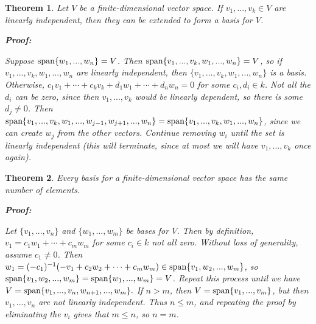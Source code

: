 \documentclass{article}
\theoremstyle{colontheorem}
\newtheorem{theorem}{Theorem}[section]
\newcommand{\Span}{\textnormal{span}}
\newenvironment{Theorem}
{
	\begin{mdframed}[backgroundcolor=TheoremOrange!10]
	\begin{theorem}
}
{
	\end{theorem}
	\end{mdframed}
	
	\vspace{.15in}
}
\newenvironment{Proof}
{
	\begin{mdframed}[backgroundcolor=ProofPurple!10]
	\textbf{Proof:}%
}
{
	\end{mdframed}
	
	\vspace{.085in}
}
\begin{document}
\begin{Theorem}
	
	Let $V$ be a finite-dimensional vector space. If $v_1, ..., v_k \in V$ are linearly independent, then they can be extended to form a basis for $V$.
	
	\begin{Proof}
		Suppose $\Span \{w_1, ..., w_n\} = V$. Then $\Span \{v_1, ..., v_k, w_1, ..., w_n\} = V$, so if \linebreak $v_1, ..., v_k, w_1, ..., w_n$ are linearly independent, then $\{v_1, ..., v_k, w_1, ..., w_n\}$ is a basis. Otherwise, $c_1 v_1 + \cdots + c_k v_k + d_1 w_1 + \cdots + d_n w_n = 0$ for some $c_i , d_i \in k$. Not all the $d_i$ can be zero, since then $v_1, ..., v_k$ would be linearly dependent, so there is some $d_j \neq 0$. Then $\Span \{v_1, ..., v_k, w_1, ..., w_{j-1}, w_{j+1}, ..., w_n\} = \Span \{v_1, ..., v_k, w_1, ..., w_n\}$, since we can create $w_j$ from the other vectors. Continue removing $w_i$ until the set is linearly independent (this will terminate, since at most we will have $v_1, ..., v_k$ once again).
		
	\end{Proof}
	
\end{Theorem}



\begin{Theorem}
	
	Every basis for a finite-dimensional vector space has the same number of elements.
	
	\begin{Proof}
		Let $\{v_1, ..., v_n\}$ and $\{w_1, ..., w_m\}$ be bases for $V$. Then by definition, $v_1 = c_1 w_1 + \cdots + c_m w_m$ for some $c_i \in k$ not all zero. Without loss of generality, assume $c_1 \neq 0$. Then $w_1 = (-c_1)^{-1}(-v_1 + c_2 w_2 + \cdots + c_m w_m) \in \Span \{v_1, w_2, ..., w_m\}$, so $\Span \{v_1, w_2, ..., w_m\} = \Span \{w_1, ..., w_m\} = V$. Repeat this process until we have $V = \Span \{v_1, ..., v_n, w_{n+1}, ..., w_m\}.$ If $n > m$, then $V = \Span \{v_1, ..., v_m\}$, but then $v_1, ..., v_n$ are not linearly independent. Thus $n \leq m$, and repeating the proof by eliminating the $v_i$ gives that $m \leq n$, so $n = m$.
		
	\end{Proof}
	\vspace{-.02in}
\end{Theorem}
\end{document}
